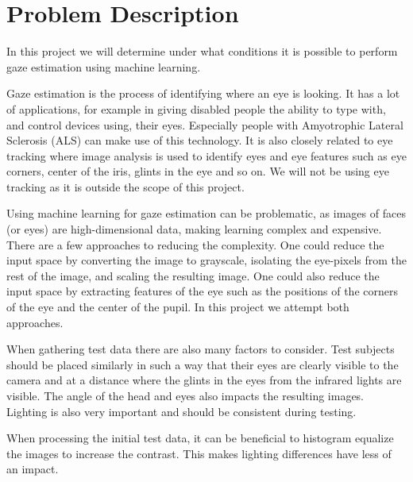 \section{Problem Description}
In this project we will determine under what conditions it is possible to perform gaze estimation using machine learning.

Gaze estimation is the process of identifying where an eye is looking.
It has a lot of applications, for example in giving disabled people the ability to type with, and control devices using, their eyes.
Especially people with Amyotrophic Lateral Sclerosis (ALS) can make use of this technology.
It is also closely related to eye tracking where image analysis is used to identify eyes and eye features such as eye corners, center of the iris, glints in the eye and so on.
We will not be using eye tracking as it is outside the scope of this project.

Using machine learning for gaze estimation can be problematic, as images of faces (or eyes) are high-dimensional data, making learning complex and expensive.
There are a few approaches to reducing the complexity.
One could reduce the input space by converting the image to grayscale, isolating the eye-pixels from the rest of the image, and scaling the resulting image.
One could also reduce the input space by extracting features of the eye such as the positions of the corners of the eye and the center of the pupil. 
In this project we attempt both approaches.

When gathering test data there are also many factors to consider.
Test subjects should be placed similarly in such a way that their eyes are clearly visible to the camera and at a distance where the glints in the eyes from the infrared lights are visible.
The angle of the head and eyes also impacts the resulting images.
Lighting is also very important and should be consistent during testing.

When processing the initial test data, it can be beneficial to histogram equalize the images to increase the contrast. This makes lighting differences have less of an impact.